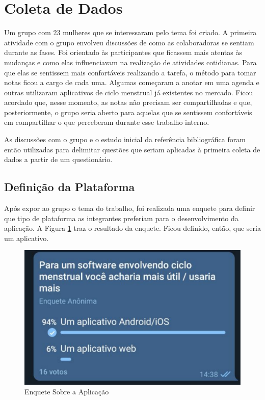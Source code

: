 \section{Coleta de Dados}

Um grupo com 23 mulheres que se interessaram pelo tema foi criado. A primeira 
atividade com o grupo envolveu discussões de como as colaboradoras se sentiam durante as fases. Foi orientado
às participantes que ficassem mais atentas às mudanças e como elas influenciavam na realização de 
atividades cotidianas. Para que elas se sentissem mais confortáveis realizando a tarefa, o método para tomar notas ficou a cargo de cada uma. 
Algumas começaram a anotar em uma agenda e outras utilizaram 
aplicativos de ciclo menstrual já existentes no mercado. Ficou acordado que, 
nesse momento, as notas não precisam ser compartilhadas e que, posteriormente, o grupo seria aberto para 
aquelas que se sentissem confortáveis em compartilhar o que perceberam 
durante esse trabalho interno.

As discussões com o grupo e o estudo inicial da referência bibliográfica foram então utilizadas para 
delimitar questões que seriam aplicadas à primeira coleta de dados a partir de um questionário.

\subsection{Definição da Plataforma}

Após expor ao grupo o tema do trabalho, foi realizada uma enquete para definir que tipo de plataforma as 
integrantes preferiam para o desenvolvimento da aplicação. A Figura \ref{fig07} traz o resultado da enquete. Ficou definido, então, que seria 
um aplicativo.

\begin{figure}[ht]
	\centering
	\includegraphics[keepaspectratio=true,scale=0.3]{figuras/enqueteApp.pdf}
	\caption{Enquete Sobre a Aplicação}
        \label{fig07}
\end{figure}

